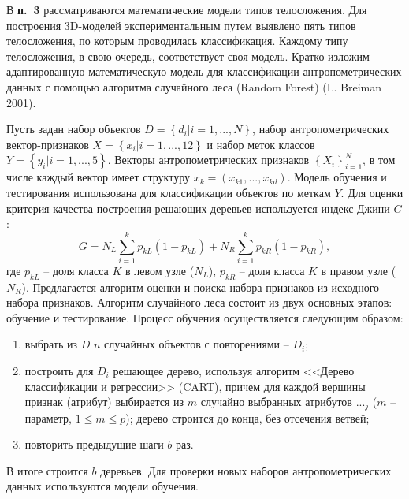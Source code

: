 В \textbf{п.~3} рассматриваются математические модели типов телосложения. Для построения 3D-моделей экспериментальным путем выявлено пять типов телосложения, по которым проводилась классификация. Каждому типу телосложения, в свою очередь, соответствует своя модель. Кратко изложим адаптированную математическую модель для классификации антропометрических данных с помощью алгоритма случайного леса (Random Forest) (L. Breiman 2001).

Пусть задан набор объектов $D=\left\{d_i|i=1, ..., N\right\}$, набор антропометрических вектор-признаков $X=\left\{x_i|i=1, ..., 12\right\}$ и набор меток классов $Y=\left\{y_i|i=1, ..., 5\right\}$. Векторы антропометрических признаков $\left\{X_i\right\}^N_{i=1}$, в том числе каждый вектор имеет структуру $x_k=\left(x_{k1}, ..., x_{kd}\right)$. Модель обучения и тестирования использована для классификации объектов по меткам $Y$. Для оценки критерия качества построения решающих деревьев используется индекс Джини $G$:
\begin{equation}\label{eq27}
G=N_L\sum^k_{i=1} p_{kL} \left(1-p_{kL}\right) + N_R\sum^k_{i=1} p_{kR} \left(1-p_{kR}\right),
\end{equation}
где $p_{kL}$ -- доля класса $K$ в левом узле ($N_L$), $p_{kR}$ -- доля класса $K$ в правом узле ($N_R$).
Предлагается алгоритм оценки и поиска набора признаков из исходного набора признаков. Алгоритм случайного леса состоит из двух основных этапов: обучение и тестирование. Процесс обучения осуществляется следующим образом:
\begin{enumerate}
	\item выбрать из $D$ $n$ случайных объектов с повторениями -- $D_i$;
	\item построить для $D_i$ решающее дерево, используя алгоритм <<Дерево классификации и регрессии>> (CART), причем для каждой вершины признак (атрибут) выбирается из $m$ случайно выбранных атрибутов ${...}_j$ ($m$ -- параметр, $1\leq m\leq p$); дерево строится до конца, без отсечения ветвей;
	\item повторить предыдущие шаги $b$ раз.
\end{enumerate}
В итоге строится $b$ деревьев. Для проверки новых наборов антропометрических данных используются модели обучения.

